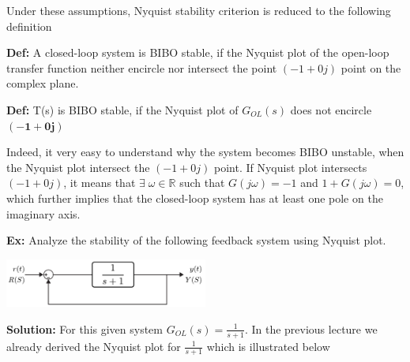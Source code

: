 \documentclass{article}
\begin{document}
Under these assumptions, Nyquist stability criterion is reduced to the
following definition 

\vspace{3pt}

\textbf{Def:} A closed-loop system is BIBO stable, if the Nyquist plot
of the open-loop transfer function neither encircle nor intersect the point $(-1
+ 0 j )$ point on the complex plane. 

\vspace{6pt}

\textbf{Def:} T(s) is BIBO stable, if the Nyquist plot of $G_{OL}(s)$ does not encircle $\mathbf{(-1 + 0 j )}$

\vspace{6pt}

\vspace{3pt}

Indeed, it very easy to understand why the system becomes BIBO
unstable, when the Nyquist plot intersect the $(-1 + 0 j )$ point. If
Nyquist plot intersects $(-1 + 0 j )$, it means that $\exists \;
\omega \in \mathbb{R}$ such that $G(j \omega) = -1$ and $1 + G(j \omega) = 0$, 
which further implies that the closed-loop system has at least one 
pole on the imaginary axis. 

\newpage

\textbf{Ex:} Analyze the stability of the following feedback system
using Nyquist plot.

\vspace{6 pt}

  \begin{minipage}[h]{1\linewidth}
    \begin{center}
      \includegraphics[width=0.5\textwidth]{figs/ex1block}
    \end{center}
  \end{minipage}

\vspace{6 pt}

\textbf{Solution:} For this given system $G_{OL}(s) = \frac{1}{s+1}$.
In the previous lecture we already derived the Nyquist plot for $\frac{1}{s+1}$
which is illustrated below

\vspace{6 pt}
\end{document}
